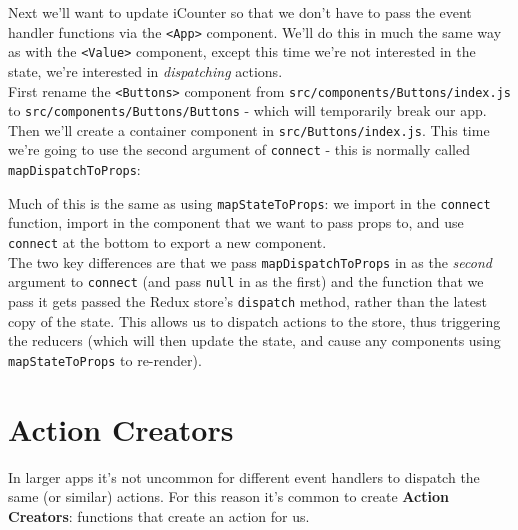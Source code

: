 Next we'll want to update iCounter so that we don't have to pass the event handler functions via the \texttt{<App>} component. We'll do this in much the same way as with the \texttt{<Value>} component, except this time we're not interested in the state, we're interested in \textit{dispatching} actions.
\\

First rename the \texttt{<Buttons>} component from  \texttt{src/components/Buttons/index.js} to \texttt{src/components/Buttons/Buttons} - which will temporarily break our app. Then we'll create a container component in \texttt{src/Buttons/index.js}. This time we're going to use the second argument of \texttt{connect} - this is normally called \texttt{mapDispatchToProps}:


Much of this is the same as using \texttt{mapStateToProps}: we import in the \texttt{connect} function, import in the component that we want to pass props to, and use \texttt{connect} at the bottom to export a new component.
\\

The two key differences are that we pass \texttt{mapDispatchToProps} in as the \textit{second} argument to \texttt{connect} (and pass \texttt{null} in as the first) and the function that we pass it gets passed the Redux store's \texttt{dispatch} method, rather than the latest copy of the state. This allows us to dispatch actions to the store, thus triggering the reducers (which will then update the state, and cause any components using \texttt{mapStateToProps} to re-render).


\par\bigskip



\section{Action Creators}

In larger apps it's not uncommon for different event handlers to dispatch the same (or similar) actions. For this reason it's common to create \textbf{Action Creators}: functions that create an action for us.
\\

